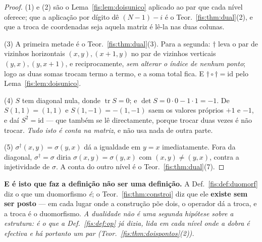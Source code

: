 \documentclass[livro.tex]{subfiles}
\begin{document}
\begin{proof}
(1) e (2) são o Lema~\ref{fis:lem:doisunico} aplicado ao par que cada nível
oferece; que a aplicação por dígito dê $(N-1)-i$ é o
Teor.~\ref{fis:thm:dual}(2), e que a troca de coordenadas seja aquela matriz é
lê-la nas duas colunas.

(3) A primeira metade é o Teor.~\ref{fis:thm:dual}(3). Para a segunda: $\dagger$
leva o par de vizinhos horizontais $(x,y),(x{+}1,y)$ no par de vizinhos verticais
$(y,x),(y,x{+}1)$, e reciprocamente, \emph{sem alterar o índice de nenhum ponto};
logo as duas somas trocam termo a termo, e a soma total fica. E
$\dagger\circ\dagger=\mathrm{id}$ pelo Lema~\ref{fis:lem:doisunico}.

(4) $S$ tem diagonal nula, donde $\operatorname{tr}S=0$; e
$\det S=0\cdot0-1\cdot1=-1$. De $S(1,1)=(1,1)$ e $S(1,-1)=-(1,-1)$ saem os
valores próprios $+1$ e $-1$, e daí $S^{2}=\mathrm{id}$ --- que também se lê
directamente, porque trocar duas vezes é não trocar. \emph{Tudo isto é conta na
matriz}, e não usa nada de outra parte.

(5) $\sigma^{\dagger}(x,y)=\sigma(y,x)$ dá a igualdade em $y=x$ imediatamente.
Fora da diagonal, $\sigma^{\dagger}=\sigma$ diria $\sigma(x,y)=\sigma(y,x)$ com
$(x,y)\neq(y,x)$, contra a injetividade de $\sigma$. A conta do outro nível é o
Teor.~\ref{fis:thm:dual}(7).
\end{proof}

\medskip\noindent\textbf{E é isto que faz a definição não ser uma definição.} A
Def.~\ref{fis:def:duomorf} diz o que um duomorfismo \emph{é}; o
Teor.~\ref{fis:thm:constroi} diz que ele \textbf{existe sem ser posto} --- em cada
lugar onde a construção põe dois, o operador dá a troca, e a troca é o
duomorfismo. \emph{A dualidade não é uma segunda hipótese sobre a estrutura: é o
que a Def.~\ref{fis:def:op} já dizia, lida em cada nível onde a dobra é efectiva e
há portanto um par (Teor.~\ref{fis:thm:doispontos}(2)).}

\end{document}
